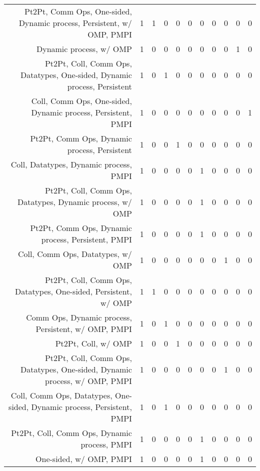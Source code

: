 {\begin{landscape}
\begin{longtable}[htb]{r|c|c|c|c|c|c|c|c|c|c}
{Pt2Pt, Comm Ops, One-sided, Dynamic process, Persistent, w/ OMP, PMPI} & 1 & 1 & 0 & 0 & 0 & 0 & 0 & 0 & 0 & 0 \\%
{Dynamic process, w/ OMP} & 1 & 0 & 0 & 0 & 0 & 0 & 0 & 0 & 1 & 0 \\%
{Pt2Pt, Coll, Comm Ops, Datatypes, One-sided, Dynamic process, Persistent} & 1 & 0 & 1 & 0 & 0 & 0 & 0 & 0 & 0 & 0 \\%
{Coll, Comm Ops, One-sided, Dynamic process, Persistent, PMPI} & 1 & 0 & 0 & 0 & 0 & 0 & 0 & 0 & 0 & 1 \\%
{Pt2Pt, Comm Ops, Dynamic process, Persistent} & 1 & 0 & 0 & 1 & 0 & 0 & 0 & 0 & 0 & 0 \\%
{Coll, Datatypes, Dynamic process, PMPI} & 1 & 0 & 0 & 0 & 0 & 1 & 0 & 0 & 0 & 0 \\%
{Pt2Pt, Coll, Comm Ops, Datatypes, Dynamic process, w/ OMP} & 1 & 0 & 0 & 0 & 0 & 1 & 0 & 0 & 0 & 0 \\%
{Pt2Pt, Comm Ops, Dynamic process, Persistent, PMPI} & 1 & 0 & 0 & 0 & 0 & 1 & 0 & 0 & 0 & 0 \\%
{Coll, Comm Ops, Datatypes, w/ OMP} & 1 & 0 & 0 & 0 & 0 & 0 & 0 & 1 & 0 & 0 \\%
{Pt2Pt, Coll, Comm Ops, Datatypes, One-sided, Persistent, w/ OMP} & 1 & 1 & 0 & 0 & 0 & 0 & 0 & 0 & 0 & 0 \\%
{Comm Ops, Dynamic process, Persistent, w/ OMP, PMPI} & 1 & 0 & 1 & 0 & 0 & 0 & 0 & 0 & 0 & 0 \\%
{Pt2Pt, Coll, w/ OMP} & 1 & 0 & 0 & 1 & 0 & 0 & 0 & 0 & 0 & 0 \\%
{Pt2Pt, Coll, Comm Ops, Datatypes, One-sided, Dynamic process, w/ OMP, PMPI} & 1 & 0 & 0 & 0 & 0 & 0 & 0 & 1 & 0 & 0 \\%
{Coll, Comm Ops, Datatypes, One-sided, Dynamic process, Persistent, PMPI} & 1 & 0 & 1 & 0 & 0 & 0 & 0 & 0 & 0 & 0 \\%
{Pt2Pt, Coll, Comm Ops, Dynamic process, PMPI} & 1 & 0 & 0 & 0 & 0 & 1 & 0 & 0 & 0 & 0 \\%
{One-sided, w/ OMP, PMPI} & 1 & 0 & 0 & 0 & 0 & 1 & 0 & 0 & 0 & 0 \\%
\hline%
\end{longtable}%
\end{landscape}}%
\clearpage%
